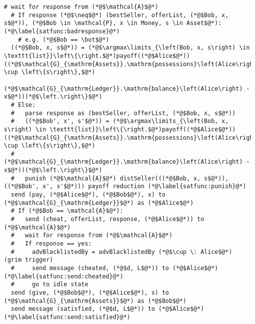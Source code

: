 \begin{lstlisting}[label=satfunc, style=numbers]
  # wait for response from (*@$\mathcal{A}$@*)
  # If response (*@$\neq$@*) (bestSeller, offerList, (*@$Bob, x, s$@*)), (*@$Bob \in \mathcal{P}, x \in Money, s \in Asset$@*): (*@\label{satfunc:badresponse}@*)
    # e.g. (*@$Bob == \bot$@*)
  ((*@$Bob, x, s$@*)) = (*@$\argmax\limits_{\left(Bob, x, s\right) \in \texttt{list}}\left\{\right.$@*)payoff((*@$Alice$@*))((*@$\mathcal{G}_{\mathrm{Assets}}.\mathrm{possessions}\left(Alice\right) \cup \left\{s\right\},$@*)
        (*@$\mathcal{G}_{\mathrm{Ledger}}.\mathrm{balance}\left(Alice\right) - x$@*))(*@$\left.\right\}$@*)
  # Else:
  #   parse response as (bestSeller, offerList, (*@$Bob, x, s$@*))
  #   ((*@$Bob', x', s'$@*)) = (*@$\argmax\limits_{\left(Bob, x, s\right) \in \texttt{list}}\left\{\right.$@*)payoff((*@$Alice$@*))((*@$\mathcal{G}_{\mathrm{Assets}}.\mathrm{possessions}\left(Alice\right) \cup \left\{s\right\},$@*)
  #      (*@$\mathcal{G}_{\mathrm{Ledger}}.\mathrm{balance}\left(Alice\right) - x$@*))(*@$\left.\right\}$@*)
  #   punish (*@$\mathcal{A}$@*) distSeller(((*@$Bob, x, s$@*)), ((*@$Bob', x', s'$@*))) payoff reduction (*@\label{satfunc:punish}@*)
  send (pay, (*@$Alice$@*), (*@$Bob$@*), x) to (*@$\mathcal{G}_{\mathrm{Ledger}}$@*) as (*@$Alice$@*)
  # If (*@$Bob == \mathcal{A}$@*):
  #   send (cheat, offerList, response, (*@$Alice$@*)) to (*@$\mathcal{A}$@*)
  #   wait for response from (*@$\mathcal{A}$@*)
  #   If response == yes:
  #     advBlacklistedBy = advBlacklistedBy (*@$\cup \: Alice$@*) (grim trigger)
  #     send message (cheated, (*@$d, L$@*)) to (*@$Alice$@*) (*@\label{satfunc:send:cheated}@*)
  #     go to idle state
  send (give, (*@$Bob$@*), (*@$Alice$@*), s) to (*@$\mathcal{G}_{\mathrm{Assets}}$@*) as (*@$Bob$@*)
  send message (satisfied, (*@$d, L$@*)) to (*@$Alice$@*) (*@\label{satfunc:send:satisfied}@*)
\end{lstlisting}
